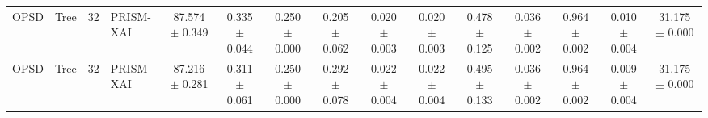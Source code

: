 \begin{table}[t]
\begin{tabular}{llllccccccccccc}
OPSD & Tree & 32 & PRISM-XAI & 87.574 $\pm$ 0.349 & 0.335 $\pm$ 0.044 & 0.250 $\pm$ 0.000 & 0.205 $\pm$ 0.062 & 0.020 $\pm$ 0.003 & 0.020 $\pm$ 0.003 & 0.478 $\pm$ 0.125 & 0.036 $\pm$ 0.002 & 0.964 $\pm$ 0.002 & 0.010 $\pm$ 0.004 & 31.175 $\pm$ 0.000 \\
OPSD & Tree & 32 & PRISM-XAI & 87.216 $\pm$ 0.281 & 0.311 $\pm$ 0.061 & 0.250 $\pm$ 0.000 & 0.292 $\pm$ 0.078 & 0.022 $\pm$ 0.004 & 0.022 $\pm$ 0.004 & 0.495 $\pm$ 0.133 & 0.036 $\pm$ 0.002 & 0.964 $\pm$ 0.002 & 0.009 $\pm$ 0.004 & 31.175 $\pm$ 0.000 \\
\bottomrule
\end{tabular}
\end{table}
